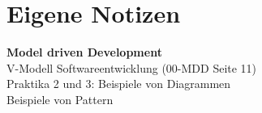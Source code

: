 \section{Eigene Notizen}
\textbf{Model driven Development}\\
V-Modell Softwareentwicklung (00-MDD Seite 11)\\
Praktika 2 und 3: Beispiele von Diagrammen\\
Beispiele von Pattern
\newpage \ \\
\newpage \ \\
\newpage \ \\
\newpage \ \\